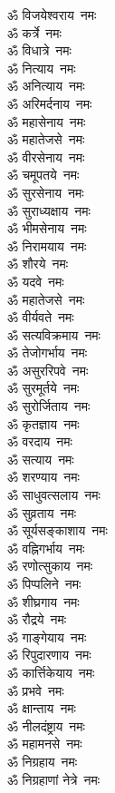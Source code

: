 \begin{multicols}{2}
\begin{flushleft}
ॐ विजयेश्वराय~नमः\\
ॐ कर्त्रे~नमः\\
ॐ विधात्रे~नमः\\
ॐ नित्याय~नमः\\
ॐ अनित्याय~नमः\\
ॐ अरिमर्दनाय~नमः\\
ॐ महासेनाय~नमः\\
ॐ महातेजसे~नमः\\
ॐ वीरसेनाय~नमः\\
ॐ चमूपतये~नमः\hfill{}\\
ॐ सुरसेनाय~नमः\\
ॐ सुराध्यक्षाय~नमः\\
ॐ भीमसेनाय~नमः\\
ॐ निरामयाय~नमः\\
ॐ शौरये~नमः\\
ॐ यदवे~नमः\\
ॐ महातेजसे~नमः\\
ॐ वीर्यवते~नमः\\
ॐ सत्यविक्रमाय~नमः\\
ॐ तेजोगर्भाय~नमः\hfill{}\\
ॐ असुररिपवे~नमः\\
ॐ सुरमूर्तये~नमः\\
ॐ सुरोर्जिताय~नमः\\
ॐ कृतज्ञाय~नमः\\
ॐ वरदाय~नमः\\
ॐ सत्याय~नमः\\
ॐ शरण्याय~नमः\\
ॐ साधुवत्सलाय~नमः\\
ॐ सुव्रताय~नमः\\
ॐ सूर्यसङ्काशाय~नमः\hfill{}\\
ॐ वह्निगर्भाय~नमः\\
ॐ रणोत्सुकाय~नमः\\
ॐ पिप्पलिने~नमः\\
ॐ शीघ्रगाय~नमः\\
ॐ रौद्रये~नमः\\
ॐ गाङ्गेयाय~नमः\\
ॐ रिपुदारणाय~नमः\\
ॐ कार्त्तिकेयाय~नमः\\
ॐ प्रभवे~नमः\\
ॐ क्षान्ताय~नमः\hfill{}\\
ॐ नीलदंष्ट्राय~नमः\\
ॐ महामनसे~नमः\\
ॐ निग्रहाय~नमः\\
ॐ निग्रहाणां नेत्रे~नमः\\

\end{flushleft}
\end{multicols}
